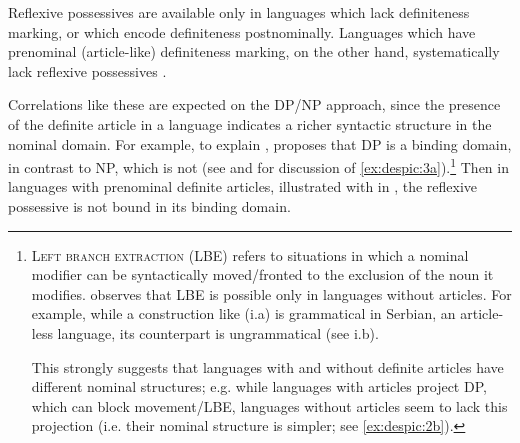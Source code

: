 \documentclass[output=paper,
modfonts
]{langscibook}
\begin{document}
	\ex \label{ex:despic:3b}
	Reflexive possessives are available only in languages which lack definiteness marking, or which encode definiteness postnominally. Languages which have prenominal (article-like) definiteness marking, on the other hand, systematically lack reflexive possessives \citep{Reuland2011, Despic2015}.
	\z
	\z 
	
	Correlations like these are expected on the DP/NP approach, since the presence of the definite article in a language indicates a richer syntactic structure in the nominal domain. 
	For example, to explain , \citet{Despic2015} proposes that DP is a binding domain, in contrast to NP, which is not (see \citealt{Boskovic2012} and \citealt{Despic2015} for discussion of \ref{ex:despic:3a}).\footnote{\textsc{Left branch extraction} (LBE) refers to situations in which a nominal modifier can be syntactically moved/fronted to the exclusion of the noun it modifies. \citet{Boskovic2008, Boskovic2012} observes that LBE is possible only in languages without articles. For example, while a construction like (i.a) is grammatical in Serbian, an article-less language, its  counterpart is ungrammatical (see i.b). 

		\ea \label{ex:despic:n3}
		
	    \z
	    \z 
	
	This strongly suggests that languages with and without definite articles have different nominal structures; e.g. while languages with articles project DP, which can block movement/LBE, languages without articles seem to lack this projection (i.e. their nominal structure is simpler; see \ref{ex:despic:2b}).}
	Then in languages with prenominal definite articles, illustrated with  in , the reflexive possessive is not bound in its binding domain.
	
\end{document}
